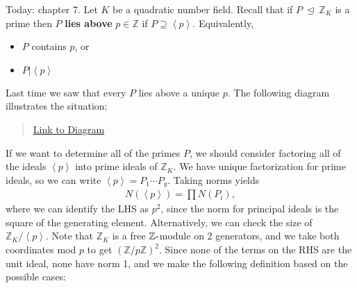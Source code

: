 \begin{remark}

Today: chapter 7. Let \(K\) be a quadratic number field. Recall that if
\(P {~\trianglelefteq~}{\mathbb{Z}}_K\) is a prime then \(P\)
\textbf{lies above} \(p\in {\mathbb{Z}}\) if
\(P \supseteq \left\langle{ p }\right\rangle\). Equivalently,

\begin{itemize}
\tightlist
\item
  \(P\) contains \(p\), or
\item
  \(P \mathrel{\Big|}\left\langle{ p }\right\rangle\)
\end{itemize}

Last time we saw that every \(P\) lies above a unique \(p\). The
following diagram illustrates the situation:

\begin{center}
\end{center}

\begin{quote}
\href{https://q.uiver.app/?q=WzAsNixbMCwwLCJLIl0sWzAsMiwiXFxRUSJdLFsyLDAsIlxcWlpfSyJdLFsyLDIsIlxcWloiXSxbNCwwLCJQIl0sWzQsMiwicCJdLFswLDEsIiIsMCx7InN0eWxlIjp7ImhlYWQiOnsibmFtZSI6Im5vbmUifX19XSxbMiwzLCIiLDAseyJzdHlsZSI6eyJoZWFkIjp7Im5hbWUiOiJub25lIn19fV0sWzQsNSwiIiwwLHsic3R5bGUiOnsiaGVhZCI6eyJuYW1lIjoibm9uZSJ9fX1dXQ==}{Link
to Diagram}
\end{quote}

If we want to determine all of the primes \(P\), we should consider
factoring all of the ideals \(\left\langle{ p }\right\rangle\) into
prime ideals of \({\mathbb{Z}}_K\). We have unique factorization for
prime ideals, so we can write
\(\left\langle{ p }\right\rangle = P_1 \cdots P_g\). Taking norms yields
\begin{align*}
N( \left\langle{ p }\right\rangle ) = \prod N(P_i) 
,\end{align*}
where we can identify the LHS as \(p^2\), since the norm for principal
ideals is the square of the generating element. Alternatively, we can
check the size of \({\mathbb{Z}}_K/ \left\langle{ p }\right\rangle\).
Note that \({\mathbb{Z}}_K\) is a free \({\mathbb{Z}}{\hbox{-}}\)module
on 2 generators, and we take both coordinates mod \(p\) to get
\(({\mathbb{Z}}/p{\mathbb{Z}})^2\). Since none of the terms on the RHS
are the unit ideal, none have norm 1, and we make the following
definition based on the possible cases:


\end{remark}
